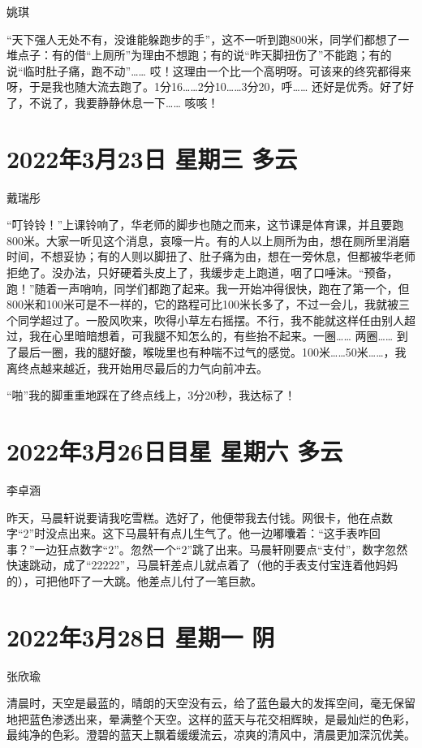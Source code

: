 姚琪

“天下强人无处不有，没谁能躲跑步的手”，这不一听到跑800米，同学们都想了一堆点子：有的借“上厕所”为理由不想跑；有的说“昨天脚扭伤了”不能跑；有的说“临时肚子痛，跑不动”…… 哎！这理由一个比一个高明呀。可该来的终究都得来呀，于是我也随大流去跑了。1分16……2分10……3分20，呼…… 还好是优秀。好了好了，不说了，我要静静休息一下…… 咳咳！

\section{2022年3月23日 星期三 多云}

戴瑞彤

“叮铃铃！”上课铃响了，华老师的脚步也随之而来，这节课是体育课，并且要跑800米。大家一听见这个消息，哀嚎一片。有的人以上厕所为由，想在厕所里消磨时间，不想妥协；有的人则以脚扭了、肚子痛为由，想在一旁休息，但都被华老师拒绝了。没办法，只好硬着头皮上了，我缓步走上跑道，咽了口唾沫。“预备，跑！”随着一声哨响，同学们都跑了起来。我一开始冲得很快，跑在了第一个，但800米和100米可是不一样的，它的路程可比100米长多了，不过一会儿，我就被三个同学超过了。一股风吹来，吹得小草左右摇摆。不行，我不能就这样任由别人超过，我在心里暗暗想着，可我腿不知怎么的，有些抬不起来。一圈…… 两圈…… 到了最后一圈，我的腿好酸，喉咙里也有种喘不过气的感觉。100米……50米……，我离终点越来越近，我开始用尽最后的力气向前冲去。

“啪”我的脚重重地踩在了终点线上，3分20秒，我达标了！

\section{2022年3月26日目星 星期六 多云}

李卓涵

昨天，马晨轩说要请我吃雪糕。选好了，他便带我去付钱。网很卡，他在点数字“2”时没点出来。这下马晨轩有点儿生气了。他一边嘟囔着：“这手表咋回事？”一边狂点数字“2”。忽然一个“2”跳了出来。马晨轩刚要点“支付”，数字忽然快速跳动，成了“22222”，马晨轩差点儿就点着了（他的手表支付宝连着他妈妈的），可把他吓了一大跳。他差点儿付了一笔巨款。

\section{2022年3月28日 星期一 阴}

张欣瑜

清晨时，天空是最蓝的，晴朗的天空没有云，给了蓝色最大的发挥空间，毫无保留地把蓝色渗透出来，晕满整个天空。这样的蓝天与花交相辉映，是最灿烂的色彩，最纯净的色彩。澄碧的蓝天上飘着缓缓流云，凉爽的清风中，清晨更加深沉优美。


